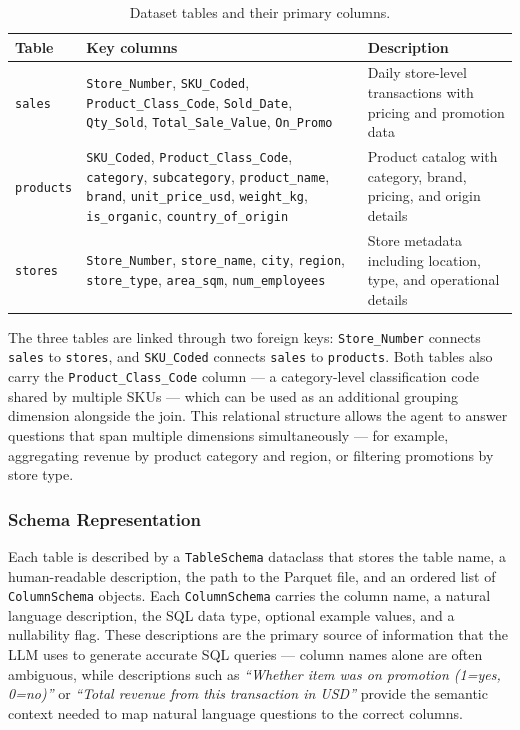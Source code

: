 \begin{table}[H]
\centering
{}
\begin{tabular}{|l|p{5.5cm}|p{5cm}|}
\hline
\rowcolor{bluePoli!30}
\textbf{Table} & \textbf{Key columns} & \textbf{Description} \T\B \\
\hline
\texttt{sales} &
  \texttt{Store\_Number}, \texttt{SKU\_Coded}, \texttt{Product\_Class\_Code},
  \texttt{Sold\_Date}, \texttt{Qty\_Sold}, \texttt{Total\_Sale\_Value}, \texttt{On\_Promo} &
  Daily store-level transactions with pricing and promotion data \T\B \\
\hline
\texttt{products} &
  \texttt{SKU\_Coded}, \texttt{Product\_Class\_Code}, \texttt{category},
  \texttt{subcategory}, \texttt{product\_name}, \texttt{brand},
  \texttt{unit\_price\_usd}, \texttt{weight\_kg}, \texttt{is\_organic},
  \texttt{country\_of\_origin} &
  Product catalog with category, brand, pricing, and origin details \T\B \\
\hline
\texttt{stores} &
  \texttt{Store\_Number}, \texttt{store\_name}, \texttt{city},
  \texttt{region}, \texttt{store\_type}, \texttt{area\_sqm},
  \texttt{num\_employees} &
  Store metadata including location, type, and operational details \T\B \\
\hline
\end{tabular}
\caption{Dataset tables and their primary columns.}
\label{tab:dataset}
\end{table}

The three tables are linked through two foreign keys: \texttt{Store\_Number}
connects \texttt{sales} to \texttt{stores}, and \texttt{SKU\_Coded} connects
\texttt{sales} to \texttt{products}. Both tables also carry the
\texttt{Product\_Class\_Code} column — a category-level classification code shared by
multiple SKUs — which can be used as an additional grouping dimension alongside the
join. This relational structure allows the agent to answer questions that span multiple
dimensions simultaneously — for example, aggregating revenue by product category
and region, or filtering promotions by store type.

\subsubsection{Schema Representation}

Each table is described by a \texttt{TableSchema} dataclass that stores the table
name, a human-readable description, the path to the Parquet file, and an ordered
list of \texttt{ColumnSchema} objects. Each \texttt{ColumnSchema} carries the column
name, a natural language description, the SQL data type, optional example values,
and a nullability flag. These descriptions are the primary source of information
that the LLM uses to generate accurate SQL queries — column names alone are often
ambiguous, while descriptions such as \textit{``Whether item was on promotion
(1=yes, 0=no)''} or \textit{``Total revenue from this transaction in USD''} provide
the semantic context needed to map natural language questions to the correct columns.

